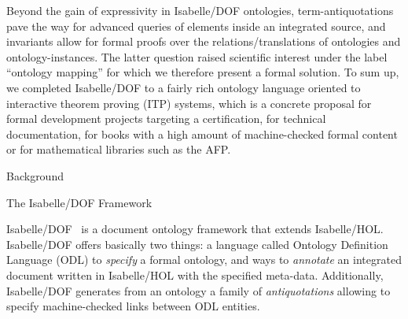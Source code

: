 \begin{isabellebody}
\begin{isamarkuptext}
Beyond the gain of expressivity in Isabelle/DOF ontologies, term-anti\-quotations pave the way 
for advanced queries of elements inside an integrated source, and invariants 
allow for formal proofs over the relations/translations of ontologies and ontology-instances.
The latter question raised scientific interest under the label ``ontology mapping'' for 
which we therefore present a formal solution. To sum up, we completed Isabelle/DOF to
a fairly rich ontology language oriented to interactive theorem proving (ITP) systems, 
which is a concrete proposal for formal development projects targeting a certification, 
for technical documentation, for books with a high amount of machine-checked formal content 
or for mathematical libraries such as the AFP.
\end{isamarkuptext}\isamarkuptrue%

\begin{isamarkupsection*}
[label = {bgrnd},type = {scholarly_paper.background}, args={label = {bgrnd},type = {scholarly_paper.background}, scholarly_paper.text_section.main_author = {@{docitem ''bu''}}, Isa_COL.text_element.level = {}, Isa_COL.text_element.referentiable = {False}, Isa_COL.text_element.variants = {{STR ''outline'', STR ''document''}}, scholarly_paper.text_section.fixme_list = {}, Isa_COL.text_element.level = {}}]Background
\end{isamarkupsection*}\isamarkuptrue%

\begin{isamarkupsubsection*}
[label = {bgrnd_isadof},type = {scholarly_paper.background}, args={label = {bgrnd_isadof},type = {scholarly_paper.background}, Isa_COL.text_element.level = {}, Isa_COL.text_element.referentiable = {False}, Isa_COL.text_element.variants = {{STR ''outline'', STR ''document''}}, scholarly_paper.text_section.main_author = {}, scholarly_paper.text_section.fixme_list = {}, Isa_COL.text_element.level = {}}]The Isabelle/DOF Framework
\end{isamarkupsubsection*}\isamarkuptrue%

\begin{isamarkuptext}
Isabelle/DOF~\cite{brucker.ea:isabelle-ontologies:2018,brucker.ea:isabelledof:2019} 
  is a document ontology framework that extends Isabelle/HOL.
  Isabelle/DOF offers basically two things: a language called Ontology Definition Language (ODL)
  to \emph{specify} a formal ontology,
  and ways to \emph{annotate} an integrated document written in Isabelle/HOL with the specified
  meta-data. Additionally, Isabelle/DOF generates from an ontology a family of 
  \emph{anti\-quotations} allowing to specify  machine-checked links between ODL entities. 


\end{isamarkuptext}
\end{isabellebody}
